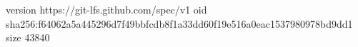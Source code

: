 version https://git-lfs.github.com/spec/v1
oid sha256:f64062a5a445296d7f49bbfcdb8f1a33dd60f19e516a0eac1537980978bd9dd1
size 43840
